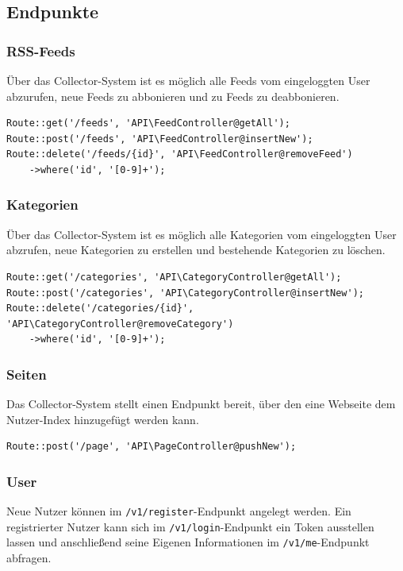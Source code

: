     \subsection{Endpunkte}
        
        \subsubsection{RSS-Feeds}
            Über das Collector-System ist es möglich alle Feeds vom eingeloggten User abzurufen, neue Feeds zu abbonieren und zu Feeds zu deabbonieren.
        
            \begin{lstlisting}
Route::get('/feeds', 'API\FeedController@getAll');
Route::post('/feeds', 'API\FeedController@insertNew');
Route::delete('/feeds/{id}', 'API\FeedController@removeFeed')
    ->where('id', '[0-9]+');
            \end{lstlisting}
        
        \subsubsection{Kategorien}
            Über das Collector-System ist es möglich alle Kategorien vom eingeloggten User abzrufen, neue Kategorien zu erstellen und bestehende Kategorien zu löschen.
        
            \begin{lstlisting}
Route::get('/categories', 'API\CategoryController@getAll');
Route::post('/categories', 'API\CategoryController@insertNew');
Route::delete('/categories/{id}', 'API\CategoryController@removeCategory')
    ->where('id', '[0-9]+');
            \end{lstlisting}
        
        \subsubsection{Seiten}
            Das Collector-System stellt einen Endpunkt bereit, über den eine Webseite dem Nutzer-Index hinzugefügt werden kann.
            \begin{lstlisting}
Route::post('/page', 'API\PageController@pushNew');
            \end{lstlisting}

        \subsubsection{User}
            Neue Nutzer können im \texttt{/v1/register}-Endpunkt angelegt werden. Ein registrierter Nutzer kann sich im \texttt{/v1/login}-Endpunkt ein Token ausstellen lassen und anschließend seine Eigenen Informationen im \texttt{/v1/me}-Endpunkt abfragen.
            
